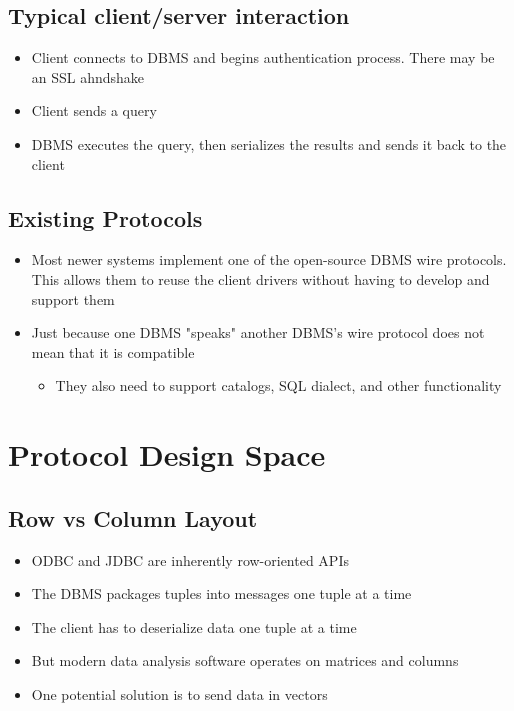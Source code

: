 \documentclass[11pt]{article}
\begin{document}
    \subsection*{Typical client/server interaction}
    \begin{itemize}
        \item Client connects to DBMS and begins authentication process. There may be an SSL ahndshake
        \item Client sends a query
        \item DBMS executes the query, then serializes the results and sends it back to the client
    \end{itemize}

    \subsection{Existing Protocols}
    \begin{itemize}
        \item Most newer systems implement one of the open-source DBMS wire protocols. This allows them to reuse the client drivers without having to develop and support them
        \item Just because one DBMS "speaks" another DBMS's wire protocol does not mean that it is compatible
        \begin{itemize}
            \item They also need to support catalogs, SQL dialect, and other functionality
        \end{itemize}
    \end{itemize}


\section{Protocol Design Space ~\cite{p1022-muehleisen}}

    \subsection*{Row vs Column Layout}
    \begin{itemize}
        \item ODBC and JDBC are inherently row-oriented APIs
        \item The DBMS packages tuples into messages one tuple at a time
        \item The client has to deserialize data one tuple at a time
        \item But modern data analysis software operates on matrices and columns
        \item One potential solution is to send data in vectors
    \end{itemize}
\end{document}
